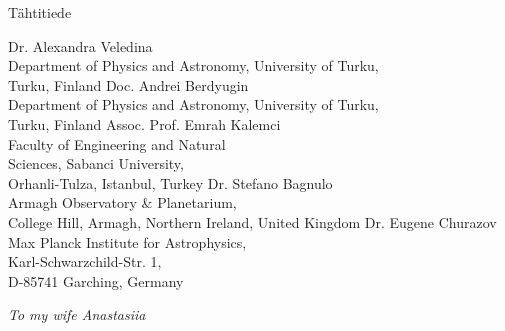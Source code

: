 
%
% 
\iffin
\else
\fi

%
%
\subject{Astronomy}{Tähtitiede}
\imgcovertrue




{Dr. Alexandra Veledina\\Department of Physics and Astronomy, University of Turku, \\Turku, Finland}
{Doc. Andrei Berdyugin\\Department of Physics and Astronomy, University of Turku, \\Turku, Finland}
{Assoc. Prof. Emrah Kalemci\\Faculty of Engineering and Natural \\ Sciences, Sabanci University, \\Orhanli-Tulza, Istanbul, Turkey}
{Dr. Stefano Bagnulo\\Armagh Observatory \& Planetarium, \\College Hill, Armagh, Northern Ireland, United Kingdom}
{Dr. Eugene Churazov\\Max Planck Institute for Astrophysics, \\Karl-Schwarzchild-Str. 1, \\D-85741 Garching, Germany}


\thispagestyle{empty}
\vspace*{\fill}
\begin{flushright}

\textit{To my wife Anastasiia}
\end{flushright}
\newpage


